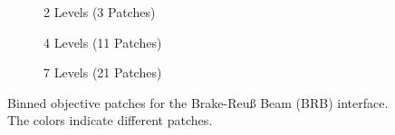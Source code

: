 \documentclass[10pt,print]{article}
\begin{document}
\begin{figure}[!h]
  \centering
  \begin{subfigure}{0.5\linewidth}
    \centering
    \caption{2 Levels (3 Patches)}
  \end{subfigure}%
  \begin{subfigure}{0.5\linewidth}
    \centering
    \caption{4 Levels (11 Patches)}
  \end{subfigure}%

  \begin{subfigure}{0.5\linewidth}
    \centering
    \caption{7 Levels (21 Patches)}
  \end{subfigure}%
  \caption{Binned objective patches for the Brake-Reu{\ss} Beam
    (BRB) interface. The colors indicate different patches.}
  \label{fig:wja}
\end{figure}
\end{document}
